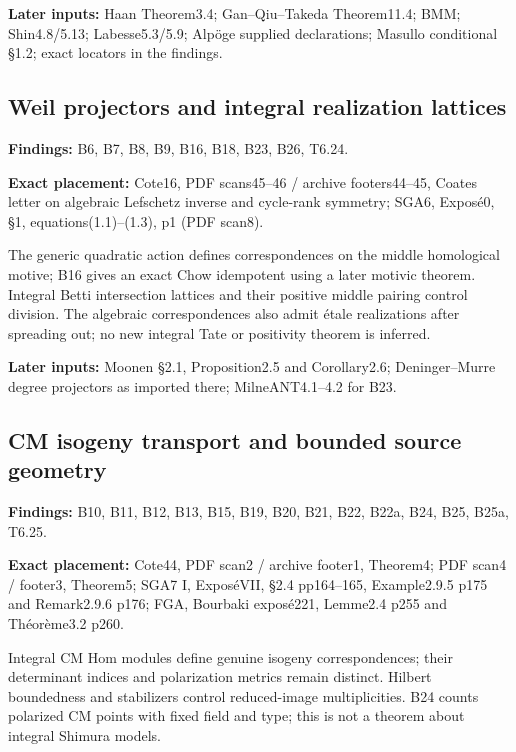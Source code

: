 \documentclass[11pt,a4paper]{article}
\theoremstyle{definition}
\begin{document}
\textbf{Later inputs:} Haan Theorem3.4; Gan--Qiu--Takeda Theorem11.4;
BMM; Shin4.8/5.13; Labesse5.3/5.9; Alpöge supplied declarations; Masullo
conditional §1.2; exact locators in the findings.

\subsection{Weil projectors and integral realization
lattices}\label{FRAMEWORK-weil-projectors-and-integral-realization-lattices}

\textbf{Findings:} B6, B7, B8, B9, B16, B18, B23, B26, T6.24.

\textbf{Exact placement:} Cote16, PDF scans45--46 / archive
footers44--45, Coates letter on algebraic Lefschetz inverse and
cycle-rank symmetry; SGA6, Exposé0, §1, equations(1.1)--(1.3), p1 (PDF
scan8).

The generic quadratic action defines correspondences on the middle
homological motive; B16 gives an exact Chow idempotent using a later
motivic theorem. Integral Betti intersection lattices and their positive
middle pairing control division. The algebraic correspondences also
admit étale realizations after spreading out; no new integral Tate or
positivity theorem is inferred.

\textbf{Later inputs:} Moonen §2.1, Proposition2.5 and Corollary2.6;
Deninger--Murre degree projectors as imported there; MilneANT4.1--4.2
for B23.

\subsection{CM isogeny transport and bounded source
geometry}\label{FRAMEWORK-cm-isogeny-transport-and-bounded-source-geometry}

\textbf{Findings:} B10, B11, B12, B13, B15, B19, B20, B21, B22, B22a,
B24, B25, B25a, T6.25.

\textbf{Exact placement:} Cote44, PDF scan2 / archive footer1, Theorem4;
PDF scan4 / footer3, Theorem5; SGA7 I, ExposéVII, §2.4 pp164--165,
Example2.9.5 p175 and Remark2.9.6 p176; FGA, Bourbaki exposé221,
Lemme2.4 p255 and Théorème3.2 p260.

Integral CM Hom modules define genuine isogeny correspondences; their
determinant indices and polarization metrics remain distinct. Hilbert
boundedness and stabilizers control reduced-image multiplicities. B24
counts polarized CM points with fixed field and type; this is not a
theorem about integral Shimura models.
\end{document}
